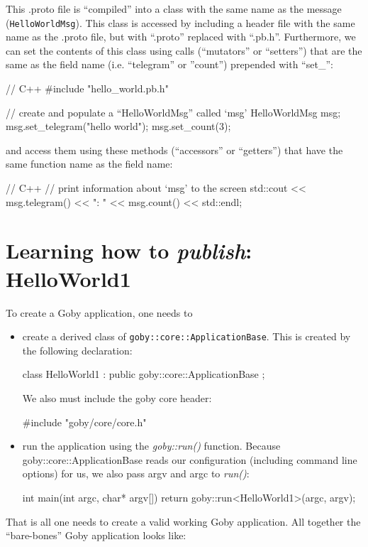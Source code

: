 \documentclass[11pt, letterpaper, oneside]{memoir}
\begin{document}
This .proto file is ``compiled'' into a class with the same name as the message (\verb|HelloWorldMsg|). This class is accessed by including a header file with the same name as the .proto file, but with ``.proto'' replaced with ``.pb.h''. Furthermore, we can set the contents of this class using calls (``mutators'' or ``setters'') that are the same as the field name (i.e. ``telegram'' or ''count'') prepended with ``set\_'':
\begin{boxedverbatim}
// C++ 
#include "hello_world.pb.h"

// create and populate a ``HelloWorldMsg'' called `msg'
HelloWorldMsg msg;
msg.set_telegram("hello world");
msg.set_count(3);
\end{boxedverbatim}
\resetbvlinenumber

and access them using these methods (``accessors'' or ``getters'') that have the same function name as the field name:

\begin{boxedverbatim}
// C++ 
// print information about `msg' to the screen
std::cout << msg.telegram() << ": " << msg.count() << std::endl;
\end{boxedverbatim}
\resetbvlinenumber


\section{Learning how to \textit{publish}: HelloWorld1}

To create a Goby application, one needs to

\begin{itemize}
\item create a derived class of \verb|goby::core::ApplicationBase|. This is created by the following declaration:
\begin{boxedverbatim}
class HelloWorld1 : public goby::core::ApplicationBase {};
\end{boxedverbatim}
\resetbvlinenumber
We also must include the goby core header:
\begin{boxedverbatim}
#include "goby/core/core.h"
\end{boxedverbatim}
\resetbvlinenumber
\item run the application using the \textit{goby::run()} function. Because goby::core::ApplicationBase reads our configuration (including command line options) for us, we also pass argv and argc to \textit{run()}:
\begin{boxedverbatim}
int main(int argc, char* argv[])
{   
    return goby::run<HelloWorld1>(argc, argv);
}
\end{boxedverbatim}
\resetbvlinenumber
\end{itemize}
That is all one needs to create a valid working Goby application. All together the ``bare-bones'' Goby application looks like:
\end{document}
